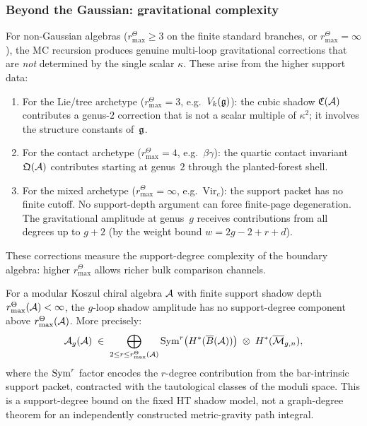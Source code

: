 \subsubsection{Beyond the Gaussian: gravitational complexity}

\begin{remark}
For non-Gaussian algebras \textup{(}\(r^\Theta_{\max}\geq3\) on the
finite standard branches, or \(r^\Theta_{\max}=\infty\)\textup{)}, the MC recursion
produces genuine multi-loop gravitational corrections that are
\emph{not} determined by the single scalar $\kappa$. These arise from the
higher support data:
\begin{enumerate}[label=(\alph*)]
\item For the Lie/tree archetype \textup{(}\(r^\Theta_{\max}=3\),
 e.g.\ $V_k(\mathfrak{g})$): the cubic shadow $\mathfrak{C}(\mathcal{A})$
 contributes a genus-$2$ correction that is not a scalar
 multiple of $\kappa^2$; it involves the structure constants
 of~$\mathfrak{g}$.
\item For the contact archetype \textup{(}\(r^\Theta_{\max}=4\),
 e.g.\ $\beta\gamma$): the quartic contact invariant
 $\mathfrak{Q}(\mathcal{A})$ contributes starting at genus~$2$
 through the planted-forest shell.
\item For the mixed archetype \textup{(}\(r^\Theta_{\max}=\infty\),
 e.g.\ $\mathrm{Vir}_c$): the support packet has no finite cutoff.
 No support-depth argument can force finite-page degeneration. The
 gravitational amplitude at genus~$g$ receives contributions
 from all degrees up to $g + 2$ (by the weight bound
 $w = 2g - 2 + r + d$).
\end{enumerate}
These corrections measure the support-degree complexity of the
boundary algebra: higher \(r^\Theta_{\max}\) allows richer bulk
comparison channels.
\end{remark}

\begin{proposition}
For a modular Koszul chiral algebra $\mathcal{A}$ with finite support shadow
depth \(r^\Theta_{\max}(\mathcal{A})<\infty\), the $g$-loop shadow amplitude
has no support-degree component above \(r^\Theta_{\max}(\mathcal{A})\). More
precisely:
\begin{equation}%
\mathcal{A}_g(\cA)
\;\in\;
\bigoplus_{2\le r\le r^\Theta_{\max}(\cA)}
\Sym^r\bigl(H^*(\barB(\cA))\bigr)
\;\otimes\;
H^*(\overline{\cM}_{g,n}),
\end{equation}
where the $\operatorname{Sym}^r$ factor encodes the $r$-degree contribution
from the bar-intrinsic support packet, contracted with the
tautological classes of the moduli space. This is a support-degree
bound on the fixed HT shadow model, not a graph-degree theorem for an
independently constructed metric-gravity path integral.
\end{proposition}


